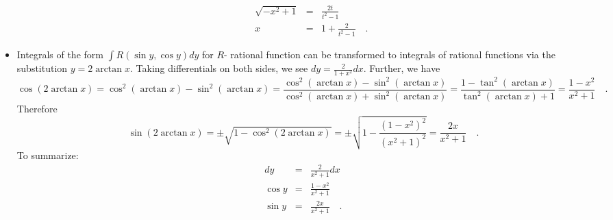 \documentclass[12pt]{book}
\begin{document}
\begin{itemize}
\begin{enumerate}
\[\begin{array}{rcl}
\sqrt{-x^2+1}&=&\frac{2t}{t^2-1} \\
x&=&1+\frac{2}{t^2-1}\quad .
\end{array}
\] 
\end{enumerate}
\item Integrals of the form $\int R(\sin y,\cos y )dy$ for $R$- rational function can be transformed to integrals of rational functions via the substitution $y= 2\arctan x$. Taking differentials on both sides, we see $dy=\frac{2}{1+x^2}dx$. Further, we have 
\[\cos (2\arctan x) = \cos^2(\arctan x)- \sin^2(\arctan x)=  \frac{\cos^2(\arctan x)- \sin^2(\arctan x)}{\cos^2(\arctan x)+ \sin^2(\arctan x)}= \frac{1- \tan^2(\arctan x)}{\tan^2(\arctan x)+1}= \frac{1- x^2}{x^2+1}\quad .
\]
Therefore 
\[\sin (2\arctan x)=\pm \sqrt{1-\cos^2(2\arctan x)}= \pm\sqrt{ 1-\frac{(1- x^2)^2}{(x^2+1)^2} }= \frac{2x}{x^2+1}\quad .
\]
To summarize:
\[
\begin{array}{rcl}
dy&=&\frac{2}{x^2+1}dx\\
\cos y&=& \frac{1- x^2}{x^2+1} \\
\sin y&=&\frac{2x}{x^2+1}\quad .
\end{array}
\] 
\end{itemize}
\end{document}
